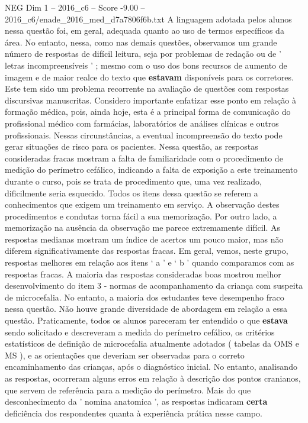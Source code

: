\begin{textsample}{NEG Dim 1 – 2016\_c6 – Score -9.00 – 2016\_c6/enade\_2016\_med\_d7a7806f6b.txt}
A linguagem adotada pelos alunos nessa questão foi, em geral, adequada quanto ao uso de termos específicos da área.
No entanto, nessa, como nas demais questões, observamos um grande número de respostas de difícil leitura, seja por problemas de redação ou de ' letras incompreensíveis ' ; mesmo com o uso dos bons recursos de aumento de imagem e de maior realce do texto que \textbf{estavam} disponíveis para os corretores.
Este tem sido um problema recorrente na avaliação de questões com respostas discursivas manuscritas.
Considero importante enfatizar esse ponto em relação à formação médica, pois, ainda hoje, esta é a principal forma de comunicação do profissional médico com farmácias, laboratórios de análises clínicas e outros profissionais.
Nessas circunstâncias, a eventual incompreensão do texto pode gerar situações de risco para os pacientes.
Nessa questão, as respostas consideradas fracas mostram a falta de familiaridade com o procedimento de medição do perímetro cefálico, indicando a falta de exposição a este treinamento durante o curso, pois se trata de procedimento que, uma vez realizado, dificilmente seria esquecido.
Todos os itens dessa questão se referem a conhecimentos que exigem um treinamento em serviço.
A observação destes procedimentos e condutas torna fácil a sua memorização.
Por outro lado, a memorização na ausência da observação me parece extremamente difícil.
As respostas medianas mostram um índice de acertos um pouco maior, mas não diferem significativamente das respostas fracas.
Em geral, vemos, neste grupo, respostas melhores em relação aos itens ‘ a ’ e ‘ b ’ quando comparamos com as respostas fracas.
A maioria das respostas consideradas boas mostrou melhor desenvolvimento do item 3 - normas de acompanhamento da criança com suspeita de microcefalia.
No entanto, a maioria dos estudantes teve desempenho fraco nessa questão.
Não houve grande diversidade de abordagem em relação a essa questão.
Praticamente, todos os alunos pareceram ter entendido o que \textbf{estava} sendo solicitado e descreveram a medida do perímetro cefálico, os critérios estatísticos de definição de microcefalia atualmente adotados ( tabelas da OMS e MS ), e as orientações que deveriam ser observadas para o correto encaminhamento das crianças, após o diagnóstico inicial.
No entanto, analisando as respostas, ocorreram alguns erros em relação à descrição dos pontos cranianos, que servem de referência para a medição do perímetro.
Mais do que desconhecimento da ' nomina anatomica ', as respostas indicaram \textbf{certa} deficiência dos respondentes quanta à experiência prática nesse campo.

\end{textsample}
